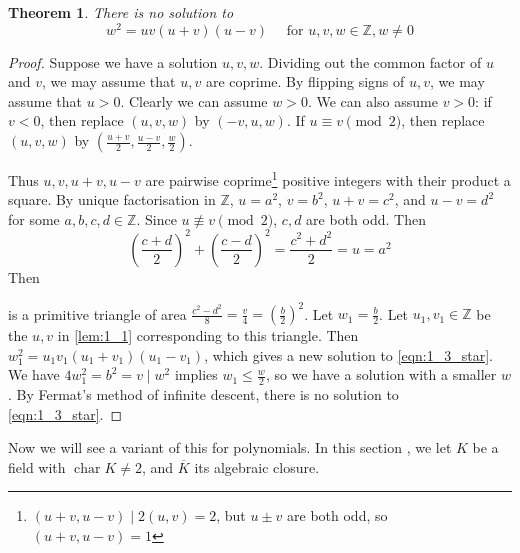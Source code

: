 \documentclass[11pt]{article}
\theoremstyle{definition}
\theoremstyle{plain}
\newtheorem{theorem}[definition]{Theorem}
\theoremstyle{remark}
\DeclareMathOperator{\Char}{char}
\newcommand{\ZZ}{\mathbb{Z}}
\begin{document}
\begin{theorem}\label{thm:1_3}
    There is no solution to
    \begin{equation}\label{eqn:1_3_star}
        w^2 = u v (u + v) (u - v) \quad \text{ for } u, v, w \in \ZZ, w \neq 0
    \end{equation}
\end{theorem}
\begin{proof}
    Suppose we have a solution $u, v, w$. Dividing out the common factor of $u$ and $v$, we may assume that $u, v$ are coprime. By flipping signs of $u, v$, we may assume that $u > 0$. Clearly we can assume $w > 0$. We can also assume $v > 0$: if $v < 0$, then replace $(u, v, w)$ by $(-v, u, w)$. If $u \equiv v \pmod{2}$, then replace $(u, v, w)$ by $(\frac{u+v}{2}, \frac{u-v}{2}, \frac{w}{2})$.

    Thus $u, v, u+v, u-v$ are pairwise coprime\footnote{$(u+v, u-v) \mid 2(u, v) = 2$, but $u \pm v$ are both odd, so $(u+v, u-v) = 1$} positive integers with their product a square. By unique factorisation in $\ZZ$, $u = a^2$, $v = b^2$, $u+v = c^2$, and $u-v = d^2$ for some $a, b, c, d \in \ZZ$. Since $u \not\equiv v \pmod{2}$, $c, d$ are both odd. Then
    \begin{equation*}
        \left(\frac{c+d}{2}\right)^2 + \left(\frac{c-d}{2}\right)^2 = \frac{c^2 + d^2}{2} = u = a^2
    \end{equation*}
    Then
    \begin{center}
    \end{center}
    is a primitive triangle of area $\frac{c^2 - d^2}{8} = \frac{v}{4} = (\frac{b}{2})^2$. Let $w_1 = \frac{b}{2}$. Let $u_1, v_1 \in \ZZ$ be the $u, v$ in \autoref{lem:1_1} corresponding to this triangle. Then $w_1^2 = u_1 v_1 (u_1 + v_1) (u_1 - v_1)$, which gives a new solution to \eqref{eqn:1_3_star}. We have $4 w_1^2 = b^2 = v \mid w^2$ implies $w_1 \le \frac{w}{2}$, so we have a solution with a smaller $w$. By Fermat's method of infinite descent, there is no solution to \eqref{eqn:1_3_star}.
\end{proof}

Now we will see a variant of this for polynomials. In this section , we let $K$ be a field with $\Char K \neq 2$, and $\overline{K}$ its algebraic closure.
\end{document}
